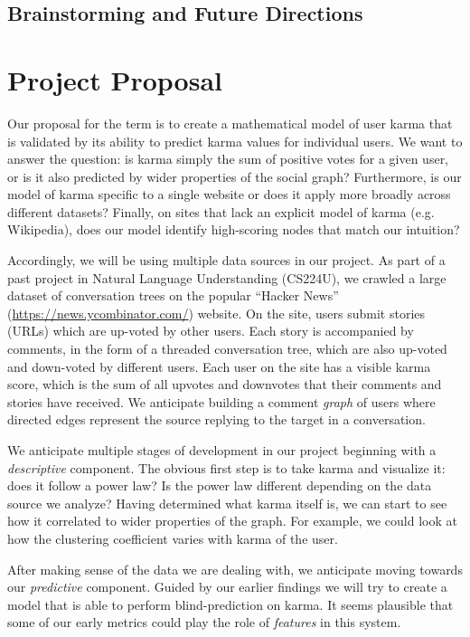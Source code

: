 \documentclass[11pt]{article}
\begin{document}
\subsection{Brainstorming and Future Directions}


\section{Project Proposal}
Our proposal for the term is to create a mathematical model of user karma that is
validated by its ability to predict karma values for individual users. We want to answer the 
question: is karma simply the sum of positive votes for a given user, or is it also 
predicted by wider properties of the social graph? Furthermore, is our model of karma
specific to a single website or does it apply more broadly across different datasets?
Finally, on sites that lack an explicit model of karma (e.g. Wikipedia), does our model
identify high-scoring nodes that match our intuition?

Accordingly, we will be using multiple data sources in our project. As part of a past project
in Natural Language Understanding (CS224U), we crawled a large dataset of conversation
trees on the popular ``Hacker News'' (\url{https://news.ycombinator.com/}) website. On the site,
users submit stories (URLs) which are up-voted by other users. Each story is accompanied
by comments, in the form of a threaded conversation tree, which are also up-voted 
and down-voted by different users. Each user on the site has a visible karma score, 
which is the sum of all upvotes and downvotes that their comments and stories have received.
We anticipate building a comment \textit{graph} of users where directed edges represent
the source replying to the target in a conversation.



We anticipate multiple stages of development in our project beginning with a \textit{descriptive}
component. The obvious first step is to take karma and visualize it: does it follow a power law? 
Is the power law different depending on the data source we analyze? Having determined what karma
itself is, we can start to see how it correlated to wider properties of the graph. For example,
we could look at how the clustering coefficient varies with karma of the user.

After making sense of the data we are dealing with, we anticipate moving towards our
\textit{predictive} component. Guided by our earlier findings we will try to create a model
that is able to perform blind-prediction on karma. It seems plausible that some of our 
early metrics could play the role of \textit{features} in this system.
\end{document}
